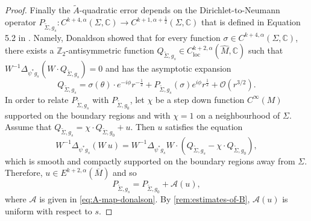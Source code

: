 \documentclass[preprint,12pt]{elsarticle}
\numberwithin{table}{section}
\newcommand{\Z}{\mathbb{Z}}
\newcommand{\C}{\mathbb{C}}
\renewcommand{\O}{\mathcal{O}}
\begin{document}
\begin{proof}
	Finally the $\tilde A$-quadratic error depends on the Dirichlet-to-Neumann operator $P_{\tilde\Sigma, g_s} \colon C^{k+4, \alpha}(\Sigma, \C) \to C^{k+1, \alpha + \frac{1}{2}}(\Sigma, \C)$ that is defined in Equation 5.2 in \cite{Donaldson2021}. Namely, Donaldson showed that for every function $\sigma \in C^{k+4, \alpha}(\Sigma, \C)$, there exists a $\Z_2$-antisymmetric function $Q_{\tilde\Sigma, g_s} \in C^{k+2, \alpha}_{\mathrm{loc}}(\hat M, \C)$ such that $W^{-1} \Delta_{\psi^* g_s} (W \cdot Q_{\tilde\Sigma, g_s}) = 0$ and has the asymptotic expansion
	$$
	Q_{\tilde\Sigma, g_s} = \sigma(\theta) \cdot e^{- i \phi} r^{-\frac{1}{2}} + P_{\tilde{\Sigma}, g_s}(\sigma) e^{i \phi} r^{\frac{1}{2}} + \O(r^{3/2}) .
	$$
	In order to relate $P_{\tilde\Sigma, g_s}$ with $P_{\tilde\Sigma, g_0}$, let $\chi$ be a step down function $C^\infty(M)$ supported on the boundary regions and with $\chi = 1$ on a neighbourhood of $\Sigma$. Assume that 
	$
	Q_{\tilde\Sigma, g_s} = \chi \cdot Q_{\tilde\Sigma, g_0} + u
	$.
	Then $u$ satisfies the equation
	$$
	W^{-1}\Delta_{\psi^* g_s} (W \: u) = W^{-1}\Delta_{\psi^* g_s}  W \cdot\left(Q_{\tilde\Sigma, g_s} - \chi \cdot Q_{\tilde\Sigma, g_0} \right),
	$$
	which is smooth and compactly supported on the boundary regions away from $\Sigma$. Therefore, $u \in E^{k+2, \alpha}(\overline{M})$ and so
	$$
	P_{\tilde \Sigma, g_s} = P_{\tilde \Sigma, g_0} + \mathcal{A}(u),
	$$
	where $\mathcal{A}$ is given in \cref{eq:A-map-donalson}.
	By \cref{rem:estimates-of-B}, $\mathcal{A}(u)$ is uniform with respect to $s$.
\end{proof}
\end{document}
